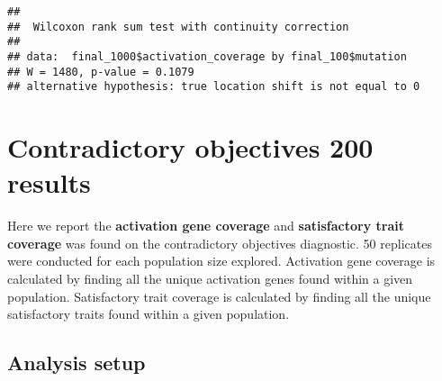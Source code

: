 \documentclass[
]{book}
\newenvironment{Shaded}{\begin{snugshade}}{\end{snugshade}}
\newcommand{\AttributeTok}[1]{\textcolor[rgb]{0.13,0.29,0.53}{#1}}
\newcommand{\ConstantTok}[1]{\textcolor[rgb]{0.56,0.35,0.01}{#1}}
\newcommand{\DecValTok}[1]{\textcolor[rgb]{0.00,0.00,0.81}{#1}}
\newcommand{\FloatTok}[1]{\textcolor[rgb]{0.00,0.00,0.81}{#1}}
\newcommand{\FunctionTok}[1]{\textcolor[rgb]{0.13,0.29,0.53}{\textbf{#1}}}
\newcommand{\NormalTok}[1]{#1}
\newcommand{\OtherTok}[1]{\textcolor[rgb]{0.56,0.35,0.01}{#1}}
\newcommand{\SpecialCharTok}[1]{\textcolor[rgb]{0.81,0.36,0.00}{\textbf{#1}}}
\newcommand{\StringTok}[1]{\textcolor[rgb]{0.31,0.60,0.02}{#1}}
\begin{document}
\begin{Shaded}
\end{Shaded}

\begin{verbatim}
## 
##  Wilcoxon rank sum test with continuity correction
## 
## data:  final_1000$activation_coverage by final_100$mutation
## W = 1480, p-value = 0.1079
## alternative hypothesis: true location shift is not equal to 0
\end{verbatim}

\hypertarget{contradictory-objectives-200-results}{%
\chapter{Contradictory objectives 200 results}\label{contradictory-objectives-200-results}}

Here we report the \textbf{activation gene coverage} and \textbf{satisfactory trait coverage} was found on the contradictory objectives diagnostic.
50 replicates were conducted for each population size explored.
Activation gene coverage is calculated by finding all the unique activation genes found within a given population.
Satisfactory trait coverage is calculated by finding all the unique satisfactory traits found within a given population.

\hypertarget{analysis-setup-3}{%
\section{Analysis setup}\label{analysis-setup-3}}
\end{document}
